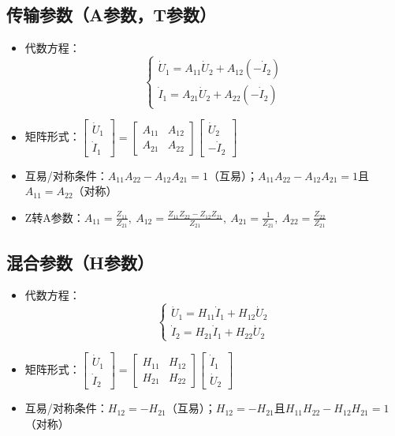 \subsection{传输参数（A参数，T参数）}
\begin{itemize}
    \item 代数方程：
    \[
    \begin{cases} 
    \dot{U}_1 = A_{11}\dot{U}_2 + A_{12}(-\dot{I}_2) \\ 
    \dot{I}_1 = A_{21}\dot{U}_2 + A_{22}(-\dot{I}_2) 
    \end{cases}
    \]
    \item 矩阵形式：$\begin{bmatrix} \dot{U}_1 \\ \dot{I}_1 \end{bmatrix} = \begin{bmatrix} A_{11} & A_{12} \\ A_{21} & A_{22} \end{bmatrix}\begin{bmatrix} \dot{U}_2 \\ -\dot{I}_2 \end{bmatrix}$
    \item 互易/对称条件：$A_{11}A_{22}-A_{12}A_{21}=1$（互易）；$A_{11}A_{22}-A_{12}A_{21}=1$且$A_{11}=A_{22}$（对称）
    \item Z转A参数：$A_{11}=\frac{Z_{11}}{Z_{21}},\ A_{12}=\frac{Z_{11}Z_{22}-Z_{12}Z_{21}}{Z_{21}},\ A_{21}=\frac{1}{Z_{21}},\ A_{22}=\frac{Z_{22}}{Z_{21}}$
\end{itemize}

\subsection{混合参数（H参数）}
\begin{itemize}
    \item 代数方程：
    \[
    \begin{cases} 
    \dot{U}_1 = H_{11}\dot{I}_1 + H_{12}\dot{U}_2 \\ 
    \dot{I}_2 = H_{21}\dot{I}_1 + H_{22}\dot{U}_2 
    \end{cases}
    \]
    \item 矩阵形式：$\begin{bmatrix} \dot{U}_1 \\ \dot{I}_2 \end{bmatrix} = \begin{bmatrix} H_{11} & H_{12} \\ H_{21} & H_{22} \end{bmatrix}\begin{bmatrix} \dot{I}_1 \\ \dot{U}_2 \end{bmatrix}$
    \item 互易/对称条件：$H_{12}=-H_{21}$（互易）；$H_{12}=-H_{21}$且$H_{11}H_{22}-H_{12}H_{21}=1$（对称）
\end{itemize}

